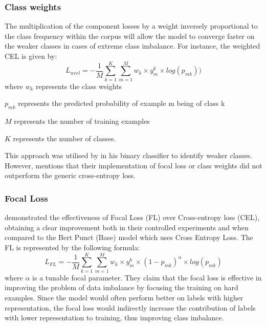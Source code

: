 \documentclass[a4paper]{article}
\begin{document}
\begin{multicols}{2}
\subsubsection{Class weights}
The multiplication of the component losses by a weight inversely proportional to the class frequency within the corpus will allow the model to converge faster on the weaker classes in cases of extreme class imbalance. For instance, the weighted CEL is given by: \[
L_{wcel}=-\frac{1}{M}\sum_{k=1}^{K}\sum_{m=1}^{M}w_k \times y_m^k \times log(p_{mk}))
\] where $w_k$ represents the class weights

$p_{mk}$ represents the predicted probability of example m being of class k 

$M$ represents the number of training examples

$K$ represents the number of classes.

This approach was utilised by \cite{adaptivenerunbalanceddata} in his binary classifier to identify weaker classes. However, \citet{efficientbertrobust} mentions that their implementation of focal loss or class weights did not outperform the generic cross-entropy loss.

\subsubsection{Focal Loss}
\citet{focallosspunct} demonstrated the effectiveness of Focal Loss (FL) over Cross-entropy loss (CEL), obtaining a clear improvement both in their controlled experiments and when compared to the Bert Punct (Base) model \citep{pandababa} which uses Cross Entropy Loss. The FL is represented by the following formula: \[L_{FL}=-\frac{1}{M}\sum_{k=1}^{K}\sum_{m=1}^{M}w_k \times y_m^k \times (1-p_{mk})^\alpha \times log(p_{mk})
\] where $\alpha$ is a tunable focal parameter.
They claim that the focal loss is effective in improving the problem of data imbalance by focusing the training on hard examples. Since the model would often perform better on labels with higher representation, the focal loss would indirectly increase the contribution of labels with lower representation to training, thus improving class imbalance.


\end{multicols}
\end{document}
